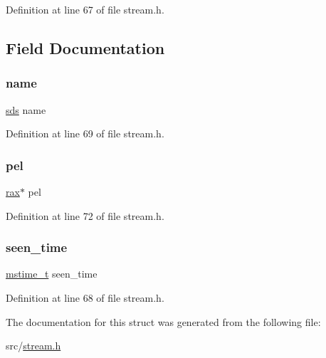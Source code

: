 Definition at line 67 of file stream.\+h.



\subsection{Field Documentation}
\mbox{\label{structstream_consumer_a78d661a433637c5e0fac8a377e3ddeb6}} 
\subsubsection{\texorpdfstring{name}{name}}
{\footnotesize\ttfamily \hyperlink{sds_8h_ad69abac3df4532879db9642c95f5ef6f}{sds} name}



Definition at line 69 of file stream.\+h.

\mbox{\label{structstream_consumer_a2fc8aed22096d11568cb29885cf08cb2}} 
\subsubsection{\texorpdfstring{pel}{pel}}
{\footnotesize\ttfamily \hyperlink{structrax}{rax}$\ast$ pel}



Definition at line 72 of file stream.\+h.

\mbox{\label{structstream_consumer_a19ba823fbbefd14094b489a211fbdeeb}} 
\subsubsection{\texorpdfstring{seen\+\_\+time}{seen\_time}}
{\footnotesize\ttfamily \hyperlink{redismodule_8h_a652ae61e2475bc8957454534544968fc}{mstime\+\_\+t} seen\+\_\+time}



Definition at line 68 of file stream.\+h.



The documentation for this struct was generated from the following file\+:\begin{DoxyCompactItemize}
\item 
src/\hyperlink{stream_8h}{stream.\+h}\end{DoxyCompactItemize}
